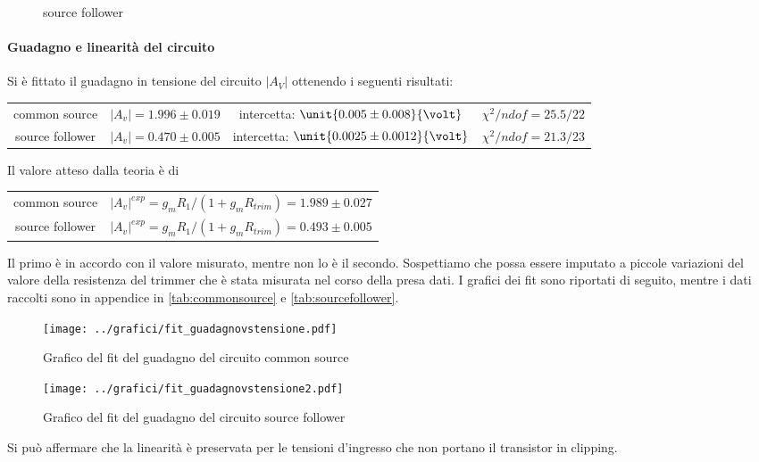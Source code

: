 \documentclass[10pt,a4paper]{article}
\begin{document}
\begin{figure}[h!]
\begin{minipage}[h!]{0.45\textwidth}
		\caption{source follower}
			\label{infase}
	\end{minipage}
\end{figure}

\paragraph{Guadagno e linearità del circuito} Si è fittato il guadagno in tensione del circuito $|A_V|$ ottenendo i seguenti risultati:

\begin{table}[h!]
	\centering
	\begin{tabular}{c|ccc}
		common source & $|A_v| = 1.996 \pm 0.019$ & intercetta: $\unit{0.005 \pm 0.008}{\volt}$ & $\chi^2 / ndof = 25.5 / 22$\\
		source follower &	$|A_v| = 0.470 \pm 0.005$ & intercetta: $\unit{0.0025 \pm 0.0012}{\volt}$ & $\chi^2 / ndof = 21.3 / 23$
	\end{tabular}
\end{table}

Il valore atteso dalla teoria è di
\begin{table}[h!]
	\centering
	\begin{tabular}{c|c}
		common source & $|A_v|^{exp} =g_mR_1/(1+g_mR_{trim}) = 1.989 \pm 0.027$ \\
		source follower &	$|A_v|^{exp} =g_mR_1/(1+g_mR_{trim}) = 0.493 \pm 0.005$
	\end{tabular}
\end{table}

Il primo è in accordo con il valore misurato, mentre non lo è il secondo. Sospettiamo che possa essere imputato a piccole variazioni del valore della resistenza del trimmer che è stata misurata nel corso della presa dati.
I grafici dei fit sono riportati di seguito, mentre i dati raccolti sono in appendice in \tablename{\ref{tab:commonsource}} e \tablename{\ref{tab:sourcefollower}}.

\begin{figure}[h!]
	\centering
	\texttt{[image: ../grafici/fit\_guadagnovstensione.pdf]}
	\caption{Grafico del fit del guadagno del circuito common source}
\end{figure}
\pagebreak
\begin{figure}[h!]
	\centering
	\texttt{[image: ../grafici/fit\_guadagnovstensione2.pdf]}
	\caption{Grafico del fit del guadagno del circuito source follower}
\end{figure}
 Si può affermare che la linearità è preservata per le tensioni d'ingresso che non portano il transistor in clipping.
  
\end{document}

